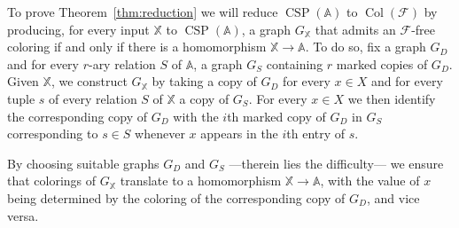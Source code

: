 \documentclass[oneside]{amsart}
\DeclareMathOperator{\col}{Col}
\newcommand{\str}[1]{\mathbb{#1}}
\newcommand{\cat}[1]{\mathcal{#1}}
\newcommand{\CSP}{\operatorname{CSP}}
\begin{document}
To prove Theorem~\ref{thm:reduction} we will reduce $\CSP(\str A)$ to $\col(\cat F)$
by producing, for every input $\str X$ to $\CSP(\str A)$, a graph $G_{\str X}$ that admits an $\cat F$-free coloring if and only if there is a homomorphism $\str X \to \str A$.
To do so, fix a graph $G_D$ and
for every $r$-ary relation $S$ of $\str A$, a graph $G_S$ containing $r$ marked copies of $G_D$.
Given $\str X$, we construct $G_{\str X}$ by taking a copy of $G_D$ for every $x \in X$ and for every tuple $s$ of every relation $S$ of $\str X$ a copy of $G_S$. 
For every $x \in X$ we then identify the corresponding copy of $G_D$ with the $i$th marked copy of $G_D$ in $G_S$ corresponding to $s\in S$ whenever $x$ appears in the $i$th entry of $s$.


By choosing suitable graphs $G_D$ and $G_S$
---therein lies the difficulty--- we ensure that colorings of $G_{\str X}$ translate to a homomorphism $\str X \to \str A$, with the value of $x$ being determined by the coloring of the corresponding copy of $G_D$, and vice versa.
\end{document}
